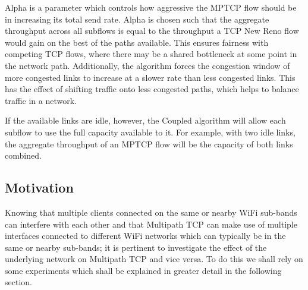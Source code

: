 Alpha is a parameter which controls how aggressive the MPTCP flow should be in
increasing its total send rate. Alpha is chosen such that the aggregate
throughput across all subflows is equal to the throughput a TCP New Reno flow
would gain on the best of the paths available. This ensures fairness with
competing TCP flows, where there may be a shared bottleneck at some point in the
network path. Additionally, the algorithm forces the congestion window of more
congested links to increase at a slower rate than less congested links. This has
the effect of shifting traffic  onto less congested paths, which helps to
balance traffic in a network.

If the available links are idle, however, the Coupled algorithm will allow each
subflow to use the full capacity available to it. For example, with two idle
links, the aggregate throughput of an MPTCP flow will be the capacity of both
links combined.

\subsection{Motivation}
Knowing that multiple clients connected on the same or nearby WiFi sub-bands 
can interfere with each other and that Multipath TCP can make use of multiple 
interfaces connected to different WiFi networks which can typically be in the 
same or nearby sub-bands; it is pertinent to investigate the effect of the 
underlying network on Multipath TCP and vice versa. To do this we shall rely on 
some experiments which shall be explained in greater detail in the following 
section.



